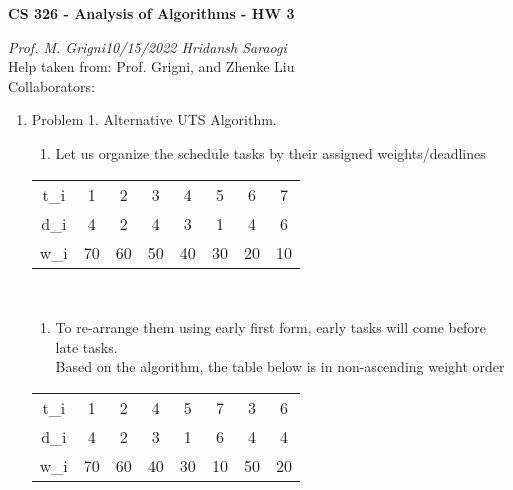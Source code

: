 \documentclass[11pt]{article}
\begin{document}
\begin{center}
    \textbf{CS 326 - Analysis of Algorithms - HW 3}\\
\end{center}


\begin{flushleft}
    \textit{Prof. M. Grigni\hfill10/15/2022 \hfill Hridansh Saraogi} \\
    \vspace{0.15cm}
    \small {Help taken from: Prof. Grigni, and Zhenke Liu}\\
    \small {Collaborators: }
\end{flushleft}


\begin{enumerate}

\item Problem 1. Alternative UTS Algorithm. 
    \begin{enumerate}
        \item Let us organize the schedule tasks by their assigned weights/deadlines
    \end{enumerate}
\begin{center}
    \begin{tabular}{ |c|c|c|c|c|c|c|c| } 
    \hline
    t_i & 1 & 2 & 3 & 4 & 5 & 6 & 7 \\ 
    d_i & 4 & 2 & 4 & 3 & 1 & 4 & 6 \\ 
    w_i & 70 & 60 & 50 & 40 & 30 & 20 & 10 \\ 
    \hline
    \end{tabular}\\
    
    \begin{enumerate}
        \item To re-arrange them using early first form, early tasks will come before late tasks.\\
        Based on the algorithm, the table below is in non-ascending weight order 
        
    \end{enumerate}
    
    \begin{tabular}{ |c|c|c|c|c|c|c|c| } 
    \hline
    t_i & 1 & 2 & 4 & 5 & 7 & 3 & 6 \\ 
    d_i & 4 & 2 & 3 & 1 & 6 & 4 & 4 \\ 
    w_i & 70 & 60 & 40 & 30 & 10 & 50 & 20 \\ 
    \hline
    \end{tabular}\\
    

\end{center}
\end{enumerate}
\end{document}
